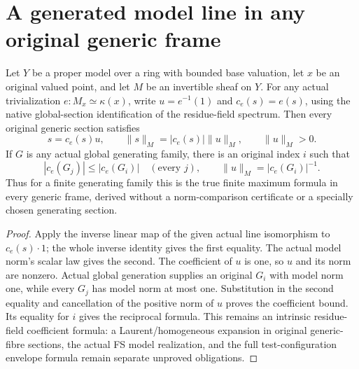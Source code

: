 \section{A generated model line in any original generic frame}

\begin{proposition}
\label{prop:generated-line-generic-frame-norms}
Let $Y$ be a proper model over a ring with bounded base valuation, let
$x$ be an original valued point, and let $M$ be an invertible sheaf on
$Y$. For any actual trivialization $e:M_x\simeq\kappa(x)$, write
$u=e^{-1}(1)$ and $c_e(s)=e(s)$, using the native global-section
identification of the residue-field spectrum. Then every original
generic section satisfies
\[
 s=c_e(s)u,\qquad \|s\|_M=|c_e(s)|\|u\|_M,
 \qquad \|u\|_M>0.
\]
If $G$ is any actual global generating family, there is an original
index $i$ such that
\[
 |c_e(G_j)|\leq |c_e(G_i)|\quad(\text{every }j),\qquad
 \|u\|_M=|c_e(G_i)|^{-1}.
\]
Thus for a finite generating family this is the true finite maximum
formula in every generic frame, derived without a norm-comparison
certificate or a specially chosen generating section.
\leanok
\end{proposition}
\begin{proof}
Apply the inverse linear map of the given actual line isomorphism to
$c_e(s)\cdot1$; the whole inverse identity gives the first equality.
The actual model norm's scalar law gives the second. The coefficient
of $u$ is one, so $u$ and its norm are nonzero. Actual global
generation supplies an original $G_i$ with model norm one, while
every $G_j$ has model norm at most one. Substitution in the second
equality and cancellation of the positive norm of $u$ proves the
coefficient bound. Its equality for $i$ gives the reciprocal formula.
This remains an intrinsic residue-field coefficient formula: a
Laurent/homogeneous expansion in original generic-fibre sections,
the actual FS model realization, and the full test-configuration
envelope formula remain separate unproved obligations.
\end{proof}
